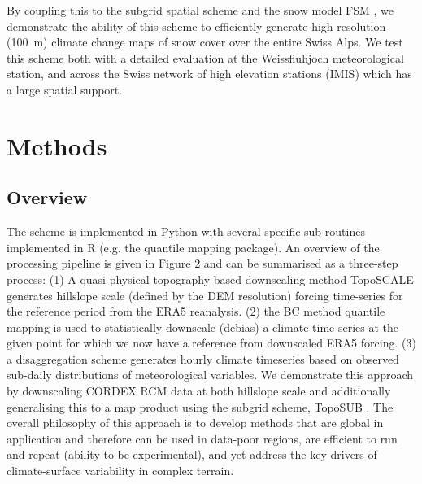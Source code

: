 \documentclass[hess, manuscript]{copernicus}
\begin{document}
By coupling this to the subgrid spatial scheme \citep{Fiddes2012-td} and the snow model FSM \cite{Essery2015-jv}, we demonstrate the ability of this scheme to efficiently generate high resolution (100~m) climate change maps of snow cover over the entire Swiss Alps. We test this scheme both with a detailed evaluation at the Weissfluhjoch meteorological station, and across the Swiss network of high elevation stations (IMIS) which has a large spatial support. %




\section{Methods}

\subsection{Overview}
The scheme is implemented in Python with several specific sub-routines implemented in R (e.g. the quantile mapping package). An overview of the processing pipeline is given in Figure 2 and can be summarised as a three-step process: (1) A quasi-physical topography-based downscaling method TopoSCALE \citep{Fiddes2014-wt} generates hillslope scale (defined by the DEM resolution) forcing time-series for the reference period from the ERA5 reanalysis. 
(2) the BC method quantile mapping \citep{Gudmundsson2012-kn} is used to statistically downscale (debias) a climate time series at the given point for which we now have a reference from downscaled ERA5 forcing. (3) a disaggregation scheme \citep{Forster2016-xx} generates hourly climate timeseries based on observed sub-daily distributions of meteorological variables. We demonstrate this approach by downscaling CORDEX RCM data at both hillslope scale and additionally generalising this to a map product using the subgrid scheme, TopoSUB \citep{Fiddes2012-td}. The overall philosophy of this approach is to develop methods that are global in application and therefore can be used in data-poor regions, are efficient to run and repeat (ability to be experimental), and yet address the key drivers of climate-surface variability in complex terrain.
\end{document}
